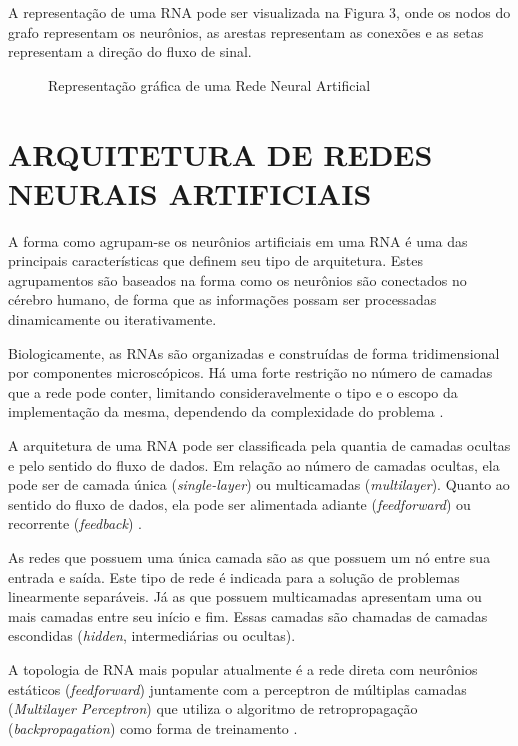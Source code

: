 A representação de uma RNA pode ser visualizada na Figura 3, onde os nodos do grafo representam os neurônios, as arestas representam as conexões e as setas representam a direção do fluxo de sinal.

\begin{figure}[h]
	\centering
	\caption{Representação gráfica de uma Rede Neural Artificial}
	\label{exec-rna}
\end{figure}

\section{ARQUITETURA DE REDES NEURAIS ARTIFICIAIS}\label{sec:redes-neurais-arquitetura}
A forma como agrupam-se os neurônios artificiais em uma RNA é uma das principais características que definem seu tipo de arquitetura. Estes agrupamentos são baseados na forma como os neurônios são conectados no cérebro humano, de forma que as informações possam ser processadas dinamicamente ou iterativamente.
 
Biologicamente, as RNAs são organizadas e construídas de forma tridimensional por componentes microscópicos. Há uma forte restrição no número de camadas que a rede pode conter, limitando consideravelmente o tipo e o escopo da implementação da mesma, dependendo da complexidade do problema \cite{haykin2009}.

A arquitetura de uma RNA pode ser classificada pela quantia de camadas ocultas e pelo sentido do fluxo de dados. Em relação ao número de camadas ocultas, ela pode ser de camada única (\textit{single-layer}) ou multicamadas (\textit{multilayer}). Quanto ao sentido do fluxo de dados, ela pode ser alimentada adiante (\textit{feedforward}) ou recorrente (\textit{feedback}) \cite{neto}.

As redes que possuem uma única camada são as que possuem um nó entre sua entrada e saída. Este tipo de rede é indicada para a solução de problemas linearmente separáveis. Já as que possuem multicamadas apresentam uma ou mais camadas entre seu início e fim. Essas camadas são chamadas de camadas escondidas (\textit{hidden}, intermediárias ou ocultas).

A topologia de RNA mais popular atualmente é a rede direta com neurônios estáticos (\textit{feedforward}) juntamente com a perceptron de múltiplas camadas (\textit {Multilayer Perceptron}) que utiliza o algoritmo de retropropagação (\textit{backpropagation}) como forma de treinamento \cite{neto}.

